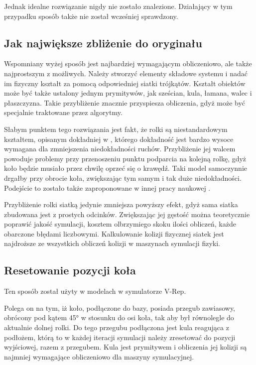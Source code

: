 	Jednak idealne rozwiązanie nigdy nie zostało znalezione.
	Działający w tym przypadku sposób także nie został wcześniej sprawdzony.

	\subsection{Jak największe zbliżenie do oryginału}
		Wspomniany wyżej sposób jest najbardziej wymagającym obliczeniowo, ale także najprostszym z możliwych.
		Należy stworzyć elementy składowe systemu i nadać im fizyczny kształt za pomocą odpowiedniej siatki trójkątów.
		Kształt obiektów może być także ustalony jednym prymitywów, jak sześcian, kula, łamana, walec i płaszczyzna.
		Takie przybliżenie znacznie przyspiesza obliczenia, gdyż może być specjalnie traktowane przez algorytmy.

		Słabym punktem tego rozwiązania jest fakt, że rolki są niestandardowym kształtem, opisanym dokładniej w \cite{rollers}, 
		którego dokładność jest bardzo wysoce wymagana dla zmniejszenia niedokładności ruchów.
		Przybliżenie jej walcem powoduje problemy przy przenoszeniu punktu podparcia na kolejną rolkę, gdyż koło będzie musiało przez chwilę oprzeć się o krawędź.
		Taki model samoczynnie drgałby przy obrocie koła, zwiększając tym samym i tak duże niedokładności. 
		Podejście to zostało także zaproponowane w innej pracy naukowej \cite{modelling_ways}.

		Przybliżenie rolki siatką jedynie zmniejsza powyższy efekt, gdyż sama siatka zbudowana jest z prostych odcinków.
		Zwiększając jej gęstość można teoretycznie poprawić jakość symulacji, kosztem olbrzymiego skoku ilości obliczeń, każde obarczone błędami liczbowymi.
		Kalkulowanie kolizji fizycznej siatek jest najdroższe ze wszystkich obliczeń kolizji w maszynach symulacji fizyki.

	\subsection{Resetowanie pozycji koła}
		Ten sposób został użyty w modelach w symulatorze V-Rep.

		Polega on na tym, iż koło, podłączone do bazy, posiada przegub zawiasowy, obrócony pod kątem 45° w stosunku do osi koła, tak aby był równolegle do aktualnie dolnej rolki.
		Do tego przegubu podłączona jest kula reagująca z podłożem, którą to w każdej iteracji symulacji należy zresetować do pozycji wyjściowej, razem z przegubem.
		Kula jest prymitywem i obliczenia jej kolizji są najmniej wymagające obliczeniowo dla maszyny symulacyjnej.

